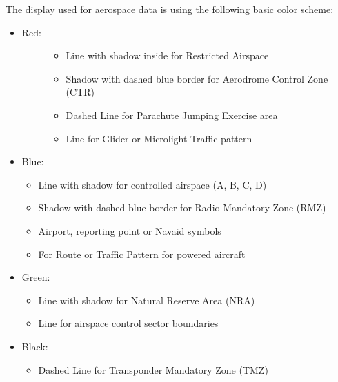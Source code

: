 \documentclass[letterpaper,10pt,english]{sphinxmanual}
\begin{document}
\sphinxAtStartPar
The display used for aerospace data is using the following basic color scheme:
\begin{itemize}
\item {} \begin{description}
\item[{Red:}] \leavevmode\begin{itemize}
\item {} 
\sphinxAtStartPar
Line with shadow inside for Restricted Airspace

\item {} 
\sphinxAtStartPar
Shadow with dashed blue border for Aerodrome Control Zone (CTR)

\item {} 
\sphinxAtStartPar
Dashed Line for Parachute Jumping Exercise area

\item {} 
\sphinxAtStartPar
Line for Glider or Microlight Traffic pattern

\end{itemize}

\end{description}

\item {} 
\sphinxAtStartPar
Blue:
\begin{itemize}
\item {} 
\sphinxAtStartPar
Line with shadow for controlled airspace (A, B, C, D)

\item {} 
\sphinxAtStartPar
Shadow with dashed blue border for Radio Mandatory Zone (RMZ)

\item {} 
\sphinxAtStartPar
Airport, reporting point or Navaid  symbols

\item {} 
\sphinxAtStartPar
For Route or Traffic Pattern for powered aircraft

\end{itemize}

\item {} 
\sphinxAtStartPar
Green:
\begin{itemize}
\item {} 
\sphinxAtStartPar
Line with shadow for Natural Reserve Area (NRA)

\item {} 
\sphinxAtStartPar
Line for airspace control sector boundaries

\end{itemize}

\item {} 
\sphinxAtStartPar
Black:
\begin{itemize}
\item {} 
\sphinxAtStartPar
Dashed Line for Transponder Mandatory Zone (TMZ)

\end{itemize}

\end{itemize}
\end{document}
